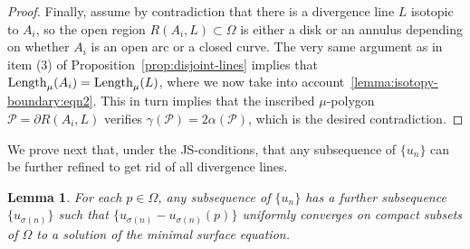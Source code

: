 \documentclass[a4paper,10pt,reqno]{amsart}
\newcommand{\Length}{\mathop{\rm Length}\nolimits}
\newtheorem{lemma}[theorem]{Lemma}
\theoremstyle{definition}
\theoremstyle{remark}
\numberwithin{equation}{section}
\begin{document}
\begin{proof}
Finally, assume by contradiction that there is a divergence line $L$ isotopic to $A_i$, so the open region $R(A_i,L)\subset\Omega$ is either a disk or an annulus depending on whether $A_i$ is an open arc or a closed curve. The very same argument as in item (3) of Proposition~\ref{prop:disjoint-lines} implies that $\Length_\mu(A_i)=\Length_\mu(L)$, where we now take into account~\eqref{lemma:isotopy-boundary:eqn2}. This in turn implies that the inscribed $\mu$-polygon $\mathcal P=\partial R(A_i,L)$ verifies $\gamma(\mathcal P)=2\alpha(\mathcal P)$, which is the desired contradiction.
\end{proof}

We prove next that, under the JS-conditions, that any subsequence of $\{u_n\}$ can be further refined to get rid of all divergence lines.

\begin{lemma}\label{lemma:convergence-JS}
For each $p\in\Omega$, any subsequence of $\{u_n\}$ has a further subsequence $\{u_{\sigma(n)}\}$ such that $\{u_{\sigma(n)}-u_{\sigma(n)}(p)\}$ uniformly converges on compact subsets of $\Omega$ to a solution of the minimal surface equation.
\end{lemma}
\end{document}
